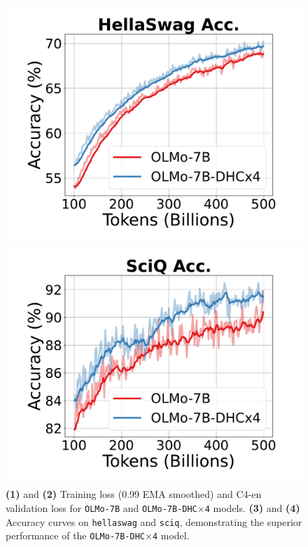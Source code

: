 \documentclass{article} %
\begin{document}
\begin{figure}[h]
\begin{minipage}{0.25\textwidth}
     \end{minipage}\hfill
    \begin{minipage}{0.25\textwidth}
        \centering
        \includegraphics[width=\linewidth]{fig/7B_hellaswag.pdf}

     \end{minipage}\hfill
    \begin{minipage}{0.25\textwidth}
        \centering
        \includegraphics[width=\linewidth]{fig/7B_sciq.pdf}
    \end{minipage}
    \caption{\textbf{(1)} and \textbf{(2)} Training loss (0.99 EMA smoothed) and C4-en validation loss for \texttt{OLMo-7B} and \texttt{OLMo-7B-DHC$\times$4} models. \textbf{(3)} and \textbf{(4)} Accuracy curves on \texttt{hellaswag} and \texttt{sciq}, demonstrating the superior performance of the \texttt{OLMo-7B-DHC$\times$4} model.}
    \label{fig:7b_training_loss}
\end{figure}
\end{document}
